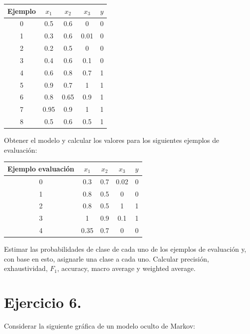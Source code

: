 \documentclass[12pt,letterpaper]{article}
\begin{document}
\bigskip
\begin{center}
\begin{tabular}{ccccc}
\toprule
Ejemplo & $x_1$ & $x_2$ & $x_3$ & $y$ \\
\midrule
0 & 0.5  & 0.6  & 0     & 0 \\
1 & 0.3  & 0.6  & 0.01  & 0 \\
2 & 0.2  & 0.5  & 0     & 0 \\
3 & 0.4  & 0.6  & 0.1   & 0 \\
4 & 0.6  & 0.8  & 0.7   & 1 \\
5 & 0.9  & 0.7  & 1     & 1 \\
6 & 0.8  & 0.65 & 0.9   & 1 \\
7 & 0.95 & 0.9  & 1     & 1 \\
8 & 0.5  & 0.6  & 0.5   & 1 \\
\bottomrule
\end{tabular}
\end{center}
 
\bigskip
Obtener el modelo y calcular los valores para los siguientes ejemplos de evaluación:
 
\bigskip
\begin{center}
\begin{tabular}{ccccc}
\toprule
Ejemplo evaluación & $x_1$ & $x_2$ & $x_3$ & $y$ \\
\midrule
0 & 0.3  & 0.7 & 0.02 & 0 \\
1 & 0.8  & 0.5 & 0    & 0 \\
2 & 0.8  & 0.5 & 1    & 1 \\
3 & 1    & 0.9 & 0.1  & 1 \\
4 & 0.35 & 0.7 & 0    & 0 \\
\bottomrule
\end{tabular}
\end{center}
 
\bigskip
Estimar las probabilidades de clase de cada uno de los ejemplos de evaluación y, con base en esto,
asignarle una clase a cada uno. Calcular precisión, exhaustividad, $F_1$, accuracy, macro average
y weighted average.

\bigskip



\newpage

\section{Ejercicio 6.}
Considerar la siguiente gráfica de un modelo oculto de Markov:
 
\end{document}
